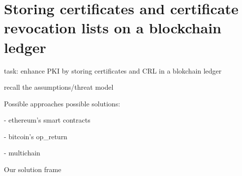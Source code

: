 \section[Storing certificates on a ledger]{Storing certificates and
certificate revocation lists on a blockchain ledger}

\begin{frame}
task: enhance PKI by storing certificates
and CRL
in a blokchain ledger

recall the assumptions/threat model
\end{frame}


\begin{frame}{Possible approaches}
possible solutions:

- ethereum's smart contracts

- bitcoin's op\_return

- multichain
\end{frame}


\begin{frame}{Our solution}
frame
\end{frame}